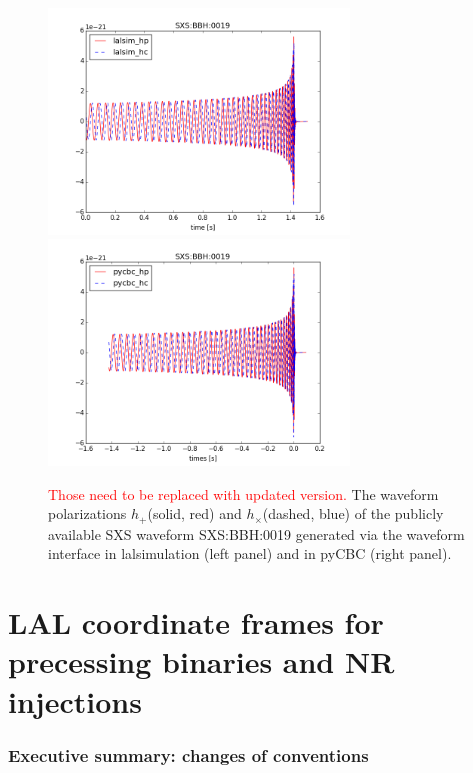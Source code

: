 \documentclass[aps,prd,amssymb,amsmath,amsfonts,superscriptaddress,
floatfix ,preprintnumbers,altaffilletter]{revtex4}
\newcommand{\red}{\textcolor{red}}
\begin{document}
\begin{figure}
\begin{center}
\includegraphics[width=80mm]{lalsim_TD_0019.png}
\includegraphics[width=80mm]{pycbc_TD_0019.png}
\caption{\red{Those need to be replaced with updated version.} The waveform polarizations $h_+$(solid, red) and $h_\times$(dashed, blue) of the publicly available SXS waveform SXS:BBH:0019 
generated via the waveform interface in lalsimulation (left panel) and in pyCBC (right panel).}
\label{fig:waveforms}
\end{center}
\end{figure}

\section{LAL coordinate frames for precessing binaries and NR injections}
\label{sec:coordinates}

\subsubsection{Executive summary: changes of conventions}
\end{document}
